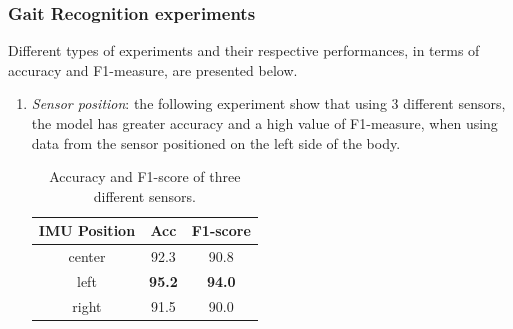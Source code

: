 \subsubsection{Gait Recognition experiments}
Different types of experiments and their respective performances, in terms of accuracy and F1-measure, are presented below.
\begin{enumerate}
    \item \emph{Sensor position}: the following experiment show that using 3 different 
    sensors, the model has greater accuracy and a high value of F1-measure, 
    when using data from the sensor positioned on the left side of the body.
    \begin{table}[h!]
        \centering
        \begin{adjustbox}{max width=\textwidth}
        \begin{tabular}{*{3}{|c}|}%
            \hline
            IMU Position & Acc & F1-score \\
            \hline
            center & 92.3 & 90.8\\
            left & \bfseries{95.2} & \bfseries{94.0}\\
            right & 91.5 & 90.0\\
            \hline
        \end{tabular}
        \end{adjustbox}
        \caption{Accuracy and F1-score of three different sensors.}
        \label{table accuracy and F1}
    \end{table}


\end{enumerate}
